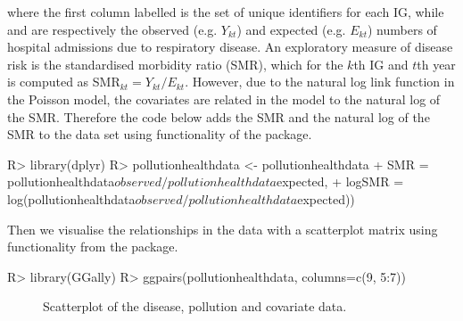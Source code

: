\documentclass[article, nojss]{jss}
\begin{document}
where the first column labelled  is the set of unique identifiers for each IG, while  and  are respectively the observed (e.g. $Y_{kt}$) and expected (e.g. $E_{kt}$) numbers of hospital admissions due to respiratory disease. An exploratory measure of disease risk is the standardised morbidity ratio (SMR), which for the $k$th IG and $t$th year is computed as SMR$_{kt}=Y_{kt}/E_{kt}$. However, due to the natural log link function in the Poisson model, the covariates are related in the model to the natural log of the SMR. Therefore the code below adds the SMR and the natural log of the SMR to the data set using functionality of the  package.

\begin{Schunk}
\begin{Sinput}
R>  library(dplyr)
R>  pollutionhealthdata <- pollutionhealthdata %
+           SMR = pollutionhealthdata$observed / pollutionhealthdata$expected, 
+           logSMR = log(pollutionhealthdata$observed / pollutionhealthdata$expected))
\end{Sinput}
\end{Schunk}


Then we visualise the relationships in the data with a scatterplot matrix using functionality from the  package.

\begin{Schunk}
\begin{Sinput}
R>  library(GGally)
R>  ggpairs(pollutionhealthdata, columns=c(9, 5:7))
\end{Sinput}
\end{Schunk}



\begin{figure}
\centering 
{}
\caption{Scatterplot of the disease, pollution and covariate data.\label{pollution_scatterplot}}
\end{figure} 
\end{document}
